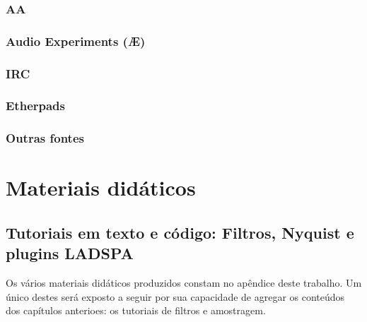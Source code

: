 \subsubsection{AA}

\subsubsection{Audio Experiments (Æ)}

\subsubsection{IRC}

\subsubsection{Etherpads}

\subsubsection{Outras fontes}


\section{Materiais didáticos}

  \subsection{Tutoriais em texto e código: Filtros, Nyquist e plugins LADSPA}

Os vários materiais didáticos produzidos constam no apêndice
deste trabalho. Um único destes será exposto a seguir por sua
capacidade de agregar os conteúdos dos capítulos anterioes:
os tutoriais de filtros e amostragem.

